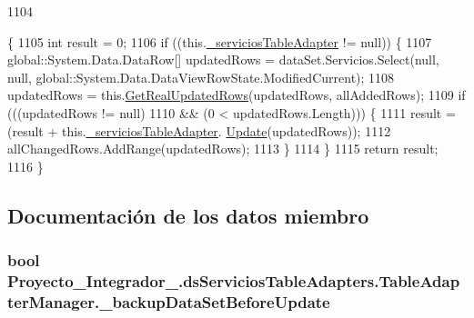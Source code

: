 \begin{DoxyCode}
1104                                                                                                            
                                                                                                                  
          \{
1105             \textcolor{keywordtype}{int} result = 0;
1106             \textcolor{keywordflow}{if} ((this.\hyperlink{class_proyecto___integrador__3_1_1ds_servicios_table_adapters_1_1_table_adapter_manager_ac26b431a74f60f4ba1f8cc57cb5e75e2}{\_serviciosTableAdapter} != null)) \{
1107                 global::System.Data.DataRow[] updatedRows = dataSet.Servicios.Select(null, null, 
      global::System.Data.DataViewRowState.ModifiedCurrent);
1108                 updatedRows = this.\hyperlink{class_proyecto___integrador__3_1_1ds_servicios_table_adapters_1_1_table_adapter_manager_a32c8e4d34a932fd8b581e954c7e50376}{GetRealUpdatedRows}(updatedRows, allAddedRows);
1109                 \textcolor{keywordflow}{if} (((updatedRows != null) 
1110                             && (0 < updatedRows.Length))) \{
1111                     result = (result + this.\hyperlink{class_proyecto___integrador__3_1_1ds_servicios_table_adapters_1_1_table_adapter_manager_ac26b431a74f60f4ba1f8cc57cb5e75e2}{\_serviciosTableAdapter}.
      \hyperlink{class_proyecto___integrador__3_1_1ds_servicios_table_adapters_1_1_servicios_table_adapter_aeef3160a3e0bdc86f499f0f9ad7221fd}{Update}(updatedRows));
1112                     allChangedRows.AddRange(updatedRows);
1113                 \}
1114             \}
1115             \textcolor{keywordflow}{return} result;
1116         \}
\end{DoxyCode}


\subsection{Documentación de los datos miembro}
\hypertarget{class_proyecto___integrador__3_1_1ds_servicios_table_adapters_1_1_table_adapter_manager_a927989eb7658909cc36dcf21241330f3}{
\subsubsection[{\-\_\-backup\-Data\-Set\-Before\-Update}]{\setlength{\rightskip}{0pt plus 5cm}bool Proyecto\-\_\-\-Integrador\-\_.\-ds\-Servicios\-Table\-Adapters.\-Table\-Adapter\-Manager.\-\_\-backup\-Data\-Set\-Before\-Update\hspace{0.3cm}{\ttfamily [private]}}}\label{class_proyecto___integrador__3_1_1ds_servicios_table_adapters_1_1_table_adapter_manager_a927989eb7658909cc36dcf21241330f3}


